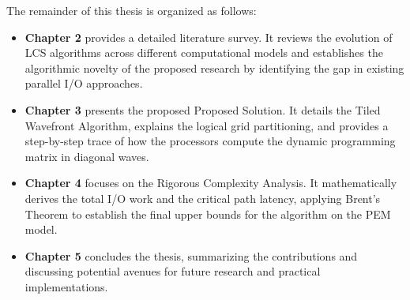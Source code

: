The remainder of this thesis is organized as follows: 
\begin{itemize}
    \item \textbf{Chapter 2} provides a detailed literature survey. It reviews the evolution of LCS algorithms across different computational models and establishes the algorithmic novelty of the proposed research by identifying the gap in existing parallel I/O approaches.
    \item \textbf{Chapter 3} presents the proposed Proposed Solution. It details the Tiled Wavefront Algorithm, explains the logical grid partitioning, and provides a step-by-step trace of how the processors compute the dynamic programming matrix in diagonal waves.
    \item \textbf{Chapter 4} focuses on the Rigorous Complexity Analysis. It mathematically derives the total I/O work and the critical path latency, applying Brent's Theorem to establish the final upper bounds for the algorithm on the PEM model.
    \item \textbf{Chapter 5} concludes the thesis, summarizing the contributions and discussing potential avenues for future research and practical implementations.
\end{itemize}

